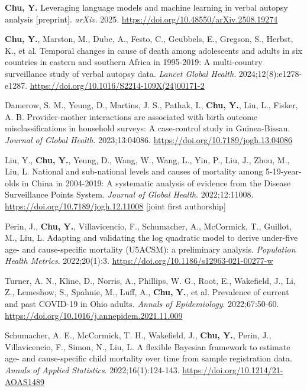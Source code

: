 \documentclass[
  11pt,
  letterpaper,
]{article}
\begin{document}
\begin{etaremune}
\item \textbf{Chu, Y.} Leveraging language models and machine learning in verbal autopsy analysis [preprint]. \emph{arXiv}. 2025. \url{https://doi.org/10.48550/arXiv.2508.19274}
\item \textbf{Chu, Y.}, Marston, M., Dube, A., Festo, C., Geubbels, E., Gregson, S., Herbst, K., et al. Temporal changes in cause of death among adolescents and adults in six countries in eastern and southern Africa in 1995-2019: A multi-country surveillance study of verbal autopsy data. \emph{Lancet Global Health}. 2024;12(8):e1278-e1287. \url{https://doi.org/10.1016/S2214-109X(24)00171-2}
\item Damerow, S. M., Yeung, D., Martins, J. S., Pathak, I., \textbf{Chu, Y.}, Liu, L., Fisker, A. B. Provider-mother interactions are associated with birth outcome misclassifications in household surveys: A case-control study in Guinea-Bissau. \emph{Journal of Global Health}. 2023;13:04086. \url{https://doi.org/10.7189/jogh.13.04086}
\item Liu, Y., \textbf{Chu, Y.}, Yeung, D., Wang, W., Wang, L., Yin, P., Liu, J., Zhou, M., Liu, L. National and sub-national levels and causes of mortality among 5-19-year-olds in China in 2004-2019: A systematic analysis of evidence from the Disease Surveillance Points System. \emph{Journal of Global Health}. 2022;12:11008. \url{https://doi.org/10.7189/jogh.12.11008} [joint first authorship]
\item Perin, J., \textbf{Chu, Y.}, Villavicencio, F., Schumacher, A., McCormick, T., Guillot, M., Liu, L. Adapting and validating the log quadratic model to derive under-five age- and cause-specific mortality (U5ACSM): a preliminary analysis. \emph{Population Health Metrics}. 2022;20(1):3. \url{https://doi.org/10.1186/s12963-021-00277-w}
\item Turner, A. N., Kline, D., Norris, A., Phillips, W. G., Root, E., Wakefield, J., Li, Z., Lemeshow, S., Spahnie, M., Luff, A., \textbf{Chu, Y.}, et al. Prevalence of current and past COVID-19 in Ohio adults. \emph{Annals of Epidemiology}. 2022;67:50-60. \url{https://doi.org/10.1016/j.annepidem.2021.11.009}
\item Schumacher, A. E., McCormick, T. H., Wakefield, J., \textbf{Chu, Y.}, Perin, J., Villavicencio, F., Simon, N., Liu, L. A flexible Bayesian framework to estimate age- and cause-specific child mortality over time from sample registration data. \emph{Annals of Applied Statistics}. 2022;16(1):124-143. \url{https://doi.org/10.1214/21-AOAS1489}

\end{etaremune}
\end{document}

